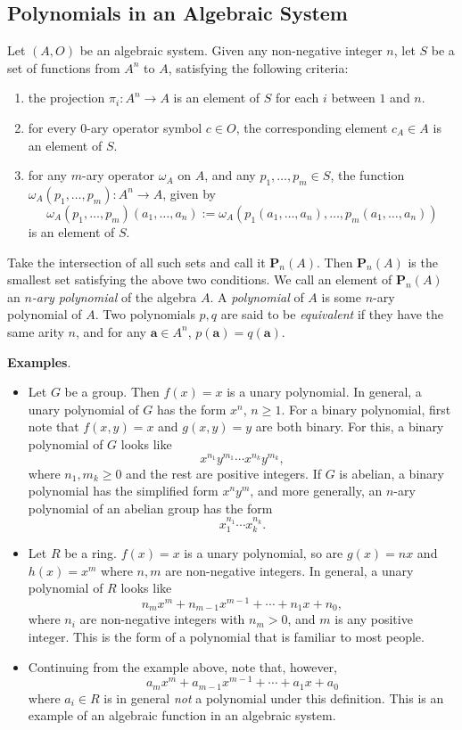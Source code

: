 \documentclass[12pt]{article}
\begin{document}
\subsection*{Polynomials in an Algebraic System}
Let $(A,O)$ be an algebraic system.  Given any non-negative integer $n$, let $S$ be a set of functions from $A^n$ to $A$, satisfying the following criteria:
\begin{enumerate}
\item the projection $\pi_i:A^n\to A$ is an element of $S$ for each $i$ between $1$ and $n$.
\item for every $0$-ary operator symbol $c\in O$, the corresponding element $c_A\in A$ is an element of $S$. 
\item for any $m$-ary operator $\omega_A$ on $A$, and any $p_1,\ldots,p_m\in S$, the function $\omega_A(p_1,\ldots,p_m):A^n\to A$, given by $$\omega_A(p_1,\ldots,p_m)(a_1,\ldots,a_n):=\omega_A(p_1(a_1,\ldots,a_n),\ldots, p_m(a_1,\ldots,a_n))$$
is an element of $S$.
\end{enumerate}
Take the intersection of all such sets and call it $\textbf{P}_n(A)$.  Then $\textbf{P}_n(A)$ is the smallest set satisfying the above two conditions.  We call an element of $\textbf{P}_n(A)$ an \emph{$n$-ary polynomial} of the algebra $A$.  A \emph{polynomial} of $A$ is some $n$-ary polynomial of $A$.  Two polynomials $p,q$ are said to be \emph{equivalent} if they have the same arity $n$, and for any $\textbf{a}\in A^n$, $p(\textbf{a})=q(\textbf{a})$.

\textbf{Examples}.
\begin{itemize}
\item Let $G$ be a group.  Then $f(x)=x$ is a unary polynomial.  In general, a unary polynomial of $G$ has the form $x^n$, $n\ge 1$.  For a binary polynomial, first note that $f(x,y)=x$ and $g(x,y)=y$ are both binary.  For this, a binary polynomial of $G$ looks like $$x^{n_1}y^{m_1}\cdots x^{n_k}y^{m_k},$$ where $n_1,m_k\ge 0$ and the rest are positive integers.  If $G$ is abelian, a binary polynomial has the simplified form $x^ny^m$, and more generally, an $n$-ary polynomial of an abelian group has the form $$x_1^{n_1}\cdots x_k^{n_k}.$$
\item Let $R$ be a ring.  $f(x)=x$ is a unary polynomial, so are $g(x)=nx$ and $h(x)=x^m$ where $n,m$ are non-negative integers.  In general, a unary polynomial of $R$ looks like 
$$n_mx^{m}+n_{m-1}x^{m-1}+\cdots + n_1x+n_0,$$
where $n_i$ are non-negative integers with $n_m>0$, and $m$ is any positive integer.  This is the form of a polynomial that is familiar to most people.
\item Continuing from the example above, note that, however, $$a_mx^{m}+a_{m-1}x^{m-1}+\cdots + a_1x+a_0$$ where $a_i\in R$ is in general \emph{not} a polynomial under this definition.  This is an example of an algebraic function in an algebraic system.
\end{itemize}
\end{document}
